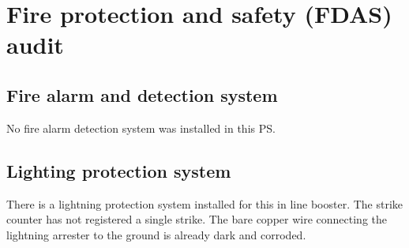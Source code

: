\section{Fire protection and safety (FDAS) audit} \label{ch04fdas}



\subsection{Fire alarm and detection system} \label{ch04fdas01}
No fire alarm detection system was installed in this PS.

\subsection{Lighting protection system} \label{ch04fdas02}

There is a lightning protection system installed for this in line booster. The strike counter has not registered a single strike. The bare copper wire connecting the lightning arrester to the ground is already dark and corroded.


